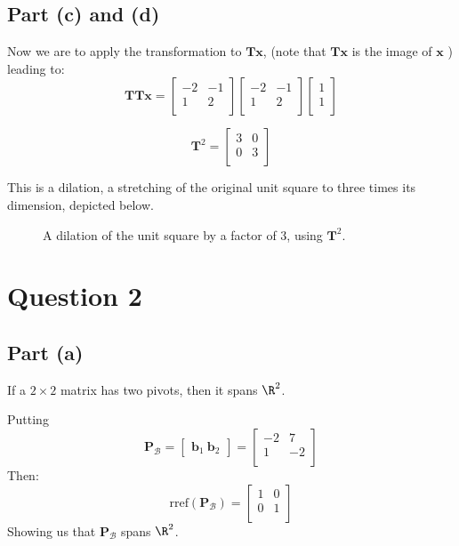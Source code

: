 \documentclass{article}
\begin{document}
\subsection{Part (c) and (d)} 
Now we are to apply the transformation to $ \mathbf{T}\mathbf{x} $, (note that
$ \mathbf{T}\mathbf{x} $ is the image of $ \mathbf{x} $ ) leading to:
\[%
    \mathbf{T}\mathbf{T}\mathbf{x}
    =
    \begin{bmatrix}
        -2 & -1 \\
		1 &  2  \\		
    \end{bmatrix}
    \begin{bmatrix}
        -2 & -1 \\
		1 &  2  \\		
    \end{bmatrix}
    \begin{bmatrix}
        1\\1\\
    \end{bmatrix}
\]%

\[%
    \mathbf{T}^{2} 
    =
    \begin{bmatrix}
        3 & 0 \\
        0 & 3 \\
    \end{bmatrix}
\]%

This is a dilation, a stretching of the original unit square to three times its
dimension, depicted below.

\begin{figure}[!htbp]
    \centering
    \caption{A dilation of the unit square by a factor of 3, using $
    \mathbf{T}^{2}. $}
\end{figure}

\clearpage
\section{Question 2} 
\subsection{Part (a)} 
If a $ 2 \times 2 $ matrix has two pivots, then it spans $ \R^{2} $.

Putting
\[%
    \mathbf{P}_{\mathcal{B}} = 
    \begin{bmatrix}
        \mathbf{b}_{1} \ \mathbf{b}_{2} 
    \end{bmatrix}
    =
    \begin{bmatrix}
        -2 & 7 \\
        1 & -2 \\
    \end{bmatrix}
\]%
Then:
\[%
    \text{rref} (\mathbf{\mathbf{P}_{\mathcal{B}}}) 
    =
    \begin{bmatrix}
        1 & 0 \\
        0 & 1 \\
    \end{bmatrix}
\]%
Showing us that $ \mathbf{P}_{\mathcal{B}} $ spans $ \R^{2} $.
\end{document}
